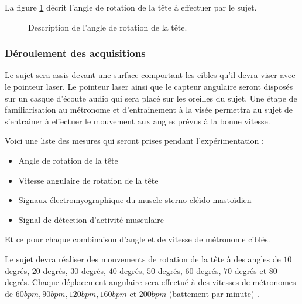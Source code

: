 \documentclass[letterpaper, twoside, 12pt, memoire, creativecommons, hyperref]{thETS}
\begin{document}
La figure \ref{fig:rotationtete} décrit l'angle de rotation de la tête à effectuer par le sujet.

\begin{figure}
	\centering
	\caption{Description de l'angle de rotation de la tête.}
	\label{fig:rotationtete}
\end{figure}

\subsubsection{Déroulement des acquisitions}

Le sujet sera assis devant une surface comportant les cibles qu’il devra viser avec le pointeur laser. Le pointeur laser ainsi que le capteur angulaire seront disposés sur un casque d’écoute audio qui sera placé sur les oreilles du sujet.
Une étape de familiarisation au métronome et d’entrainement à la visée permettra au sujet de s’entrainer à effectuer le mouvement aux angles prévus à la bonne vitesse.

Voici une liste des mesures qui seront prises pendant l’expérimentation : 

\begin{itemize}
 \item Angle de rotation de la tête 
 \item Vitesse angulaire de rotation de la tête 
 \item Signaux électromyographique du muscle sterno-cléïdo mastoïdien
 \item Signal de détection d’activité musculaire
\end{itemize}

Et ce pour chaque combinaison d’angle et de vitesse de métronome ciblés.

Le sujet devra réaliser des mouvements de rotation de la tête à des angles de $10$ degrés, $20$ degrés, $30$ degrés, $40$ degrés, $50$ degrés, $60$ degrés, $70$ degrés et $80$ degrés. Chaque déplacement angulaire sera effectué à des vitesses de métronomes de $60 bpm, 90 bpm, 120 bpm, 160 bpm$ et $200 bpm$ (battement par minute) . 
\end{document}
